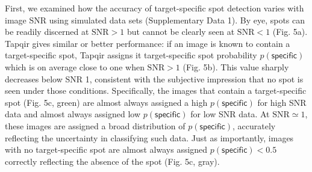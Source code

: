 First, we examined how the accuracy of target-specific spot detection varies with  image SNR using simulated data sets (Supplementary Data 1). By eye, spots can be readily discerned at $\mathrm{SNR}>1$ but cannot be clearly seen at $\mathrm{SNR}<1$ (Fig. 5a). Tapqir gives similar or better performance:  if an image is known to contain a target-specific spot, Tapqir assigns it target-specific spot probability $p(\mathsf{specific})$ which is on average close to  one when $\mathrm{SNR}>1$ (Fig. 5b).  This value sharply decreases below SNR 1, consistent with the subjective impression that no spot is seen under those conditions.  Specifically, the images that contain a target-specific spot (Fig. 5c, green) are almost always assigned a high $p(\mathsf{specific})$ for high SNR data and almost always assigned low $p(\mathsf{specific})$ for low SNR data.  At $\mathrm{SNR} \simeq 1$, these images are assigned a broad distribution of $p(\mathsf{specific})$, accurately reflecting the uncertainty in classifying such data.  Just as importantly, images with no target-specific spot are almost always assigned $p(\mathsf{specific}) < 0.5$ correctly reflecting the absence of the spot (Fig. 5c, gray).



